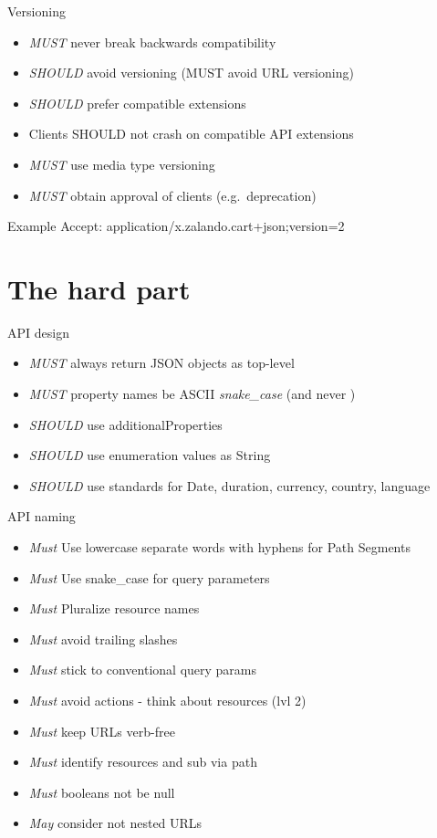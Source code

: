 \documentclass[10pt]{beamer}
\begin{document}
\begin{frame}{Versioning}
  \begin{itemize}
    \item \emph{MUST} never break backwards compatibility
    \item \emph{SHOULD} avoid versioning (MUST avoid URL versioning)
    \item \emph{SHOULD} prefer compatible extensions
    \item Clients SHOULD not crash on compatible API extensions
    \item \emph{MUST} use media type versioning
    \item \emph{MUST} obtain approval of clients (e.g.~deprecation)
  \end{itemize}

  \begin{block}{Example}
    Accept: application/x.zalando.cart+json;version=2
  \end{block}
\end{frame}

\section{The hard part}

\begin{frame}{API design}
  \begin{itemize}
    \item \emph{MUST} always return JSON objects as top-level
    \item \emph{MUST} property names be ASCII \emph{snake\_case} (and never )
    \item \emph{SHOULD} use additionalProperties
    \item \emph{SHOULD} use enumeration values as String
    \item \emph{SHOULD} use standards for Date, duration, currency, country, language
  \end{itemize}
\end{frame}

\begin{frame}{API naming}
  \begin{itemize}
    \item \emph{Must} Use lowercase separate words with hyphens for Path Segments
    \item \emph{Must} Use snake\_case for query parameters
    \item \emph{Must} Pluralize resource names
    \item \emph{Must} avoid trailing slashes
    \item \emph{Must} stick to conventional query params
    \item \emph{Must} avoid actions - think about resources (lvl 2)
    \item \emph{Must} keep URLs verb-free
    \item \emph{Must} identify resources and sub via path
    \item \emph{Must} booleans not be null
    \item \emph{May} consider not nested URLs
  \end{itemize}
\end{frame}
\end{document}
